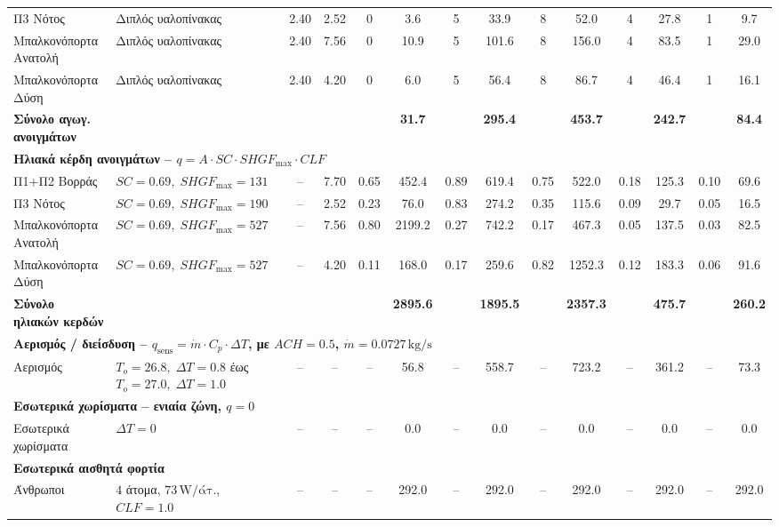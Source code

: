 \documentclass[12pt,a4paper]{article}
\begin{document}
\begin{landscape}
\begin{table}[H]
{\begin{tabular}{llcc*{5}{cc}}
Π3 Νότος & Διπλός υαλοπίνακας & 2.40 & 2.52 & 0 & 3.6 & 5 & 33.9 & 8 & 52.0 & 4 & 27.8 & 1 & 9.7 \\
Μπαλκονόπορτα Ανατολή & Διπλός υαλοπίνακας & 2.40 & 7.56 & 0 & 10.9 & 5 & 101.6 & 8 & 156.0 & 4 & 83.5 & 1 & 29.0 \\
Μπαλκονόπορτα Δύση & Διπλός υαλοπίνακας & 2.40 & 4.20 & 0 & 6.0 & 5 & 56.4 & 8 & 86.7 & 4 & 46.4 & 1 & 16.1 \\
\textbf{Σύνολο αγωγ. ανοιγμάτων} &  &  &  &  & \textbf{31.7} &  & \textbf{295.4} &  & \textbf{453.7} &  & \textbf{242.7} &  & \textbf{84.4} \\
\midrule
\multicolumn{14}{l}{\textbf{Ηλιακά κέρδη ανοιγμάτων -- \(q = A \cdot SC \cdot SHGF_{\max} \cdot CLF\)}} \\
Π1+Π2 Βορράς & \(SC=0.69,\; SHGF_{\max}=131\) & -- & 7.70 & 0.65 & 452.4 & 0.89 & 619.4 & 0.75 & 522.0 & 0.18 & 125.3 & 0.10 & 69.6 \\
Π3 Νότος & \(SC=0.69,\; SHGF_{\max}=190\) & -- & 2.52 & 0.23 & 76.0 & 0.83 & 274.2 & 0.35 & 115.6 & 0.09 & 29.7 & 0.05 & 16.5 \\
Μπαλκονόπορτα Ανατολή & \(SC=0.69,\; SHGF_{\max}=527\) & -- & 7.56 & 0.80 & 2199.2 & 0.27 & 742.2 & 0.17 & 467.3 & 0.05 & 137.5 & 0.03 & 82.5 \\
Μπαλκονόπορτα Δύση & \(SC=0.69,\; SHGF_{\max}=527\) & -- & 4.20 & 0.11 & 168.0 & 0.17 & 259.6 & 0.82 & 1252.3 & 0.12 & 183.3 & 0.06 & 91.6 \\
\textbf{Σύνολο ηλιακών κερδών} &  &  &  &  & \textbf{2895.6} &  & \textbf{1895.5} &  & \textbf{2357.3} &  & \textbf{475.7} &  & \textbf{260.2} \\
\midrule
\multicolumn{14}{l}{\textbf{Αερισμός / διείσδυση -- \(q_{\mathrm{sens}} = \dot{m} \cdot C_p \cdot \Delta T\), με \(ACH=0.5\), \(\dot{m}=0.0727\,\mathrm{kg/s}\)}} \\
Αερισμός & \(T_o=26.8,\; \Delta T=0.8\) έως \(T_o=27.0,\; \Delta T=1.0\) & -- & -- & -- & 56.8 & -- & 558.7 & -- & 723.2 & -- & 361.2 & -- & 73.3 \\
\midrule
\multicolumn{14}{l}{\textbf{Εσωτερικά χωρίσματα -- ενιαία ζώνη, \(q=0\)}} \\
Εσωτερικά χωρίσματα & \(\Delta T = 0\) & -- & -- & -- & 0.0 & -- & 0.0 & -- & 0.0 & -- & 0.0 & -- & 0.0 \\
\midrule
\multicolumn{14}{l}{\textbf{Εσωτερικά αισθητά φορτία}} \\
Άνθρωποι & \(4\) άτομα, \(73\,\mathrm{W/άτ.}\), \(CLF=1.0\) & -- & -- & -- & 292.0 & -- & 292.0 & -- & 292.0 & -- & 292.0 & -- & 292.0 \\

\end{tabular}}
\end{table}
\end{landscape}
\end{document}
